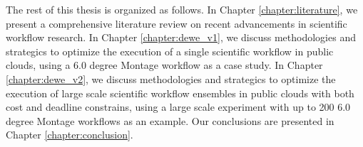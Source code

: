 The rest of this thesis is organized as follows. In Chapter \ref{chapter:literature}, we present a comprehensive literature review on recent advancements in scientific workflow research. In Chapter \ref{chapter:dewe_v1}, we discuss methodologies and strategics to optimize the execution of a single scientific workflow in public clouds, using a 6.0 degree Montage workflow as a case study. In Chapter \ref{chapter:dewe_v2}, we discuss methodologies and strategics to optimize the execution of large scale scientific workflow ensembles in public clouds with both cost and deadline constrains, using a large scale experiment with up to 200 6.0 degree Montage workflows as an example. Our conclusions are presented in Chapter \ref{chapter:conclusion}.





